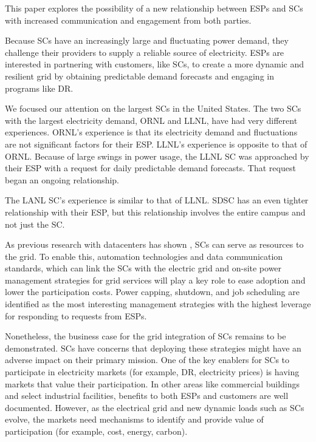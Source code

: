 This paper explores the possibility of a new relationship between ESPs
and SCs with increased communication and engagement from both parties.

Because SCs have an increasingly large and fluctuating
power demand, they challenge their providers to supply a reliable
source of electricity.
ESPs are interested in partnering with customers,
like SCs, to create a more dynamic and resilient grid
by obtaining predictable demand forecasts and engaging in programs like 
DR.

We focused our attention on the largest SCs in the United States. The two SCs with the largest electricity demand, ORNL and LLNL, have had very different experiences. 
ORNL's experience is that its electricity demand and fluctuations are not significant factors for their 
ESP. 
LLNL's experience is opposite to that of ORNL. Because of large swings in 
power usage, the LLNL SC was approached by their ESP with a 
request for daily predictable demand forecasts. That request began an ongoing relationship. 

The LANL SC's experience is similar to that of LLNL. SDSC has an even tighter relationship 
with their ESP, but this relationship involves the entire campus and not just the 
SC. 

As previous research with datacenters has shown \cite{LBNL-6560E}, SCs can serve as  
resources to the grid. To enable this, automation technologies and data communication standards, 
which can link the SCs with the electric grid and on-site power management strategies 
for grid services will play a key role to ease adoption and lower the participation costs. Power capping, 
shutdown, and job scheduling are identified as the most interesting management strategies with the highest 
leverage for responding to requests from ESPs. 

Nonetheless, the business case for the grid integration of SCs remains to be demonstrated. 
SCs have concerns that deploying these strategies might have an adverse impact on 
their primary mission. One of the key enablers for SCs to participate in 
electricity markets (for example, DR, electricity prices) is having markets that value their 
participation. In other areas like commercial buildings and select industrial facilities, benefits to 
both ESPs and customers are well documented. However, as the electrical grid 
and new dynamic loads such as SCs evolve, the markets need mechanisms to identify 
and provide value of participation (for example, cost, energy, carbon).

